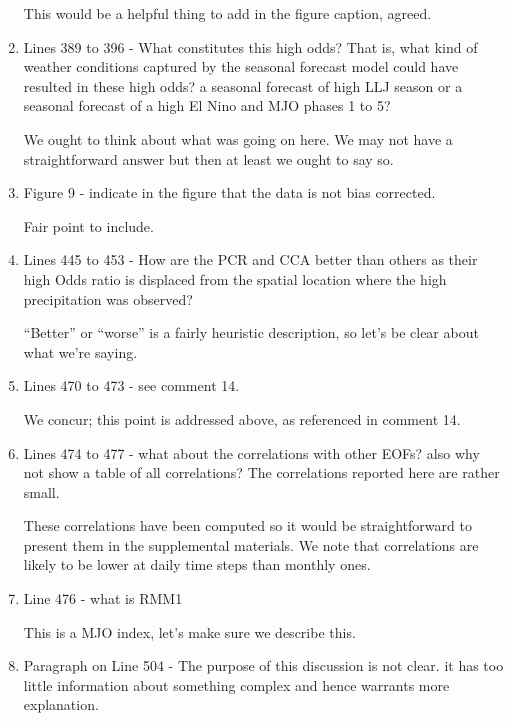 \documentclass{article}
\newenvironment{answer}{\begin{mdframed}}{\end{mdframed}}
\begin{document}
\begin{enumerate}
	\begin{answer}
		This would be a helpful thing to add in the figure caption, agreed.
	\end{answer}
	\item Lines 389 to 396 - What constitutes this high odds? That is, what kind of weather conditions captured by the seasonal forecast model could have resulted in these high odds? a seasonal forecast of high LLJ season or a seasonal forecast of a high El Nino and MJO phases 1 to 5?
	\begin{answer}
		We ought to think about what was going on here.
		We may not have a straightforward answer but then at least we ought to say so.
	\end{answer}
	\item Figure 9 - indicate in the figure that the data is not bias corrected.
	\begin{answer}
		Fair point to include.
	\end{answer}
	\item Lines 445 to 453 - How are the PCR and CCA better than others as their high Odds ratio is displaced from the spatial location where the high precipitation was observed?
	\begin{answer}
		``Better'' or ``worse'' is a fairly heuristic description, so let's be clear about what we're saying.
	\end{answer}
	\item Lines 470 to 473 - see comment 14.
	\begin{answer}
		We concur; this point is addressed above, as referenced in comment 14.
	\end{answer}
	\item Lines 474 to 477 - what about the correlations with other EOFs? also why not show a table of all correlations? The correlations reported here are rather small.
	\begin{answer}
		These correlations have been computed so it would be straightforward to present them in the supplemental materials.
		We note that correlations are likely to be lower at daily time steps than monthly ones.
	\end{answer}
	\item Line 476 - what is RMM1
	\begin{answer}
		This is a MJO index, let's make sure we describe this.
	\end{answer}
	\item Paragraph on Line 504 - The purpose of this discussion is not clear. it has too little information about something complex and hence warrants more explanation.

\end{enumerate}
\end{document}

